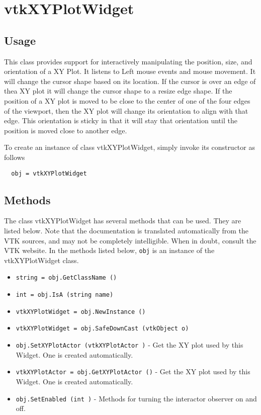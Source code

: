 \section{vtkXYPlotWidget}

\subsection{Usage}

 This class provides support for interactively manipulating the position,
 size, and orientation of a XY Plot. It listens to Left mouse events and
 mouse movement. It will change the cursor shape based on its location. If
 the cursor is over an edge of thea XY plot it will change the cursor shape
 to a resize edge shape. If the position of a XY plot is moved to be close to
 the center of one of the four edges of the viewport, then the XY plot will
 change its orientation to align with that edge. This orientation is sticky
 in that it will stay that orientation until the position is moved close to
 another edge.

To create an instance of class vtkXYPlotWidget, simply
invoke its constructor as follows
\begin{verbatim}
  obj = vtkXYPlotWidget
\end{verbatim}
\subsection{Methods}

The class vtkXYPlotWidget has several methods that can be used.
  They are listed below.
Note that the documentation is translated automatically from the VTK sources,
and may not be completely intelligible.  When in doubt, consult the VTK website.
In the methods listed below, \verb|obj| is an instance of the vtkXYPlotWidget class.
\begin{itemize}
\item  \verb|string = obj.GetClassName ()|

\item  \verb|int = obj.IsA (string name)|

\item  \verb|vtkXYPlotWidget = obj.NewInstance ()|

\item  \verb|vtkXYPlotWidget = obj.SafeDownCast (vtkObject o)|

\item  \verb|obj.SetXYPlotActor (vtkXYPlotActor )| -  Get the XY plot used by this Widget. One is created automatically.

\item  \verb|vtkXYPlotActor = obj.GetXYPlotActor ()| -  Get the XY plot used by this Widget. One is created automatically.

\item  \verb|obj.SetEnabled (int )| -  Methods for turning the interactor observer on and off.

\end{itemize}
